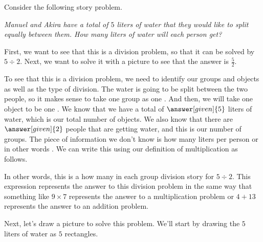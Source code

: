 \documentclass{ximera}
\begin{document}
\begin{example}
Consider the following story problem. 

\emph{Manuel and Akira have a total of $5$ liters of water that they would like to split equally between them. How many liters of water will each person get?}

First, we want to see that this is a division problem, so that it can be solved by $5 \div 2$. Next, we want to solve it with a picture to see that the answer is $\frac{5}{2}$. 


To see that this is a division problem, we need to identify our groups and objects as well as the type of division. The water is going to be split between the two people, so it makes sense to take one group as one .  And then, we will take one object to be one . We know that we have a total of $\answer[given]{5}$ liters of water, which is our total number of objects. We also know that there are $\answer[given]{2}$ people that are getting water, and this is our number of groups. The piece of information we don't know is how many liters per person or in other words . We can write this using our definition of multiplication as follows.

\begin{image}
\end{image}

In other words, this is a how many in each group division story for $5 \div 2$. This expression represents the answer to this division problem in the same way that something like $9 \times 7$ represents the answer to a multiplication problem or $4+13$ represents the answer to an addition problem.

Next, let's draw a picture to solve this problem. We'll start by drawing the $5$ liters of water as $5$ rectangles.
\begin{image}
\end{image}


\end{example}
\end{document}
